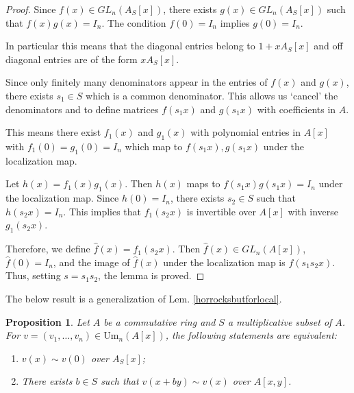 \documentclass[12pt]{article}
\numberwithin{equation}{section}
\newcounter{dummy} \numberwithin{dummy}{section}
\newtheorem{proposition}[dummy]{Proposition}
\begin{document}
		\begin{proof}
			Since $f(x) \in GL_n(A_S[x])$, there exists $g(x) \in GL_n(A_S[x])$ such that $f(x)g(x) = I_n$. The condition $f(0) = I_n$ implies $g(0) = I_n$.
			
			In particular this means that the diagonal entries belong to $1 + xA_S[x]$ and off diagonal entries are of the form $x A_S[x]$.
			
			Since only finitely many denominators appear in the entries of $f(x)$ and $g(x)$, there exists $s_1 \in S$ which is a common denominator.  This allows us `cancel' the denominators and to define matrices $f(s_1 x)$ and $g(s_1 x)$ with coefficients in $A$. 
			
			This means there exist $f_1(x)$ and $g_1(x)$ with polynomial entries in $A[x]$ with $f_1(0) = g_1(0) = I_n$ which map to $f(s_1x), g(s_1x)$ under the localization map.
			
			Let $h(x) = f_1(x)g_1(x)$. Then $h(x)$ maps to $f(s_1x)g(s_1x) = I_n$ under the localization map. Since $h(0) = I_n$, there exists $s_2 \in S$ such that $h(s_2x) = I_n$.  This implies that $f_1(s_2x)$ is invertible over $A[x]$ with inverse $g_1(s_2x)$.
			
			Therefore, we define $\hat{f}(x) = f_1(s_2x)$.  Then $\hat{f}(x) \in GL_n(A[x])$, $\hat{f}(0) = I_n$, and the image of $\hat{f}(x)$ under the localization map is $f(s_1 s_2 x)$. Thus, setting $s = s_1 s_2$, the lemma is proved.
			\end{proof}
		
			The below result is a generalization of Lem. \ref{horrocksbutforlocal}.
	\begin{proposition}\label{generaliationoflocalhorrocks}
		Let $A$ be a commutative ring and $S$ a multiplicative subset of $A$. For $v = (v_1, \dots, v_n) \in \mathrm{Um}_n(A[x])$, the following statements are equivalent:
		\begin{enumerate}
			\item $v(x) \sim v(0)$ over $A_S[x]$;
			\item There exists $b \in S$ such that $v(x + by) \sim v(x)$ over $A[x, y]$.
		\end{enumerate}
	\end{proposition}
	
\end{document}
